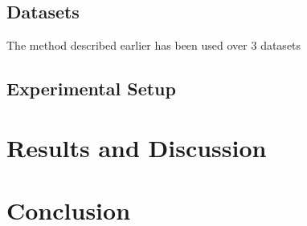 \documentclass[twocolumn, switch]{article} %
\begin{document}
\subsection{Datasets}
The method described earlier has been used over 3 datasets 

\subsection{Experimental Setup}
\lipsum[10]

\section{Results and Discussion}
\lipsum[11]

\section{Conclusion}
\lipsum[12] \cite{Cerrone}



\normalsize



\end{document}
